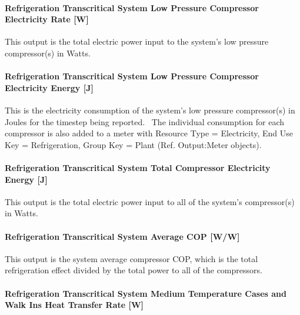 \paragraph{Refrigeration Transcritical System Low Pressure Compressor Electricity Rate {[}W{]}}\label{refrigeration-transcritical-system-low-pressure-compressor-electric-power-w}

This output is the total electric power input to the system's low pressure compressor(s) in Watts.

\paragraph{Refrigeration Transcritical System Low Pressure Compressor Electricity Energy {[}J{]}}\label{refrigeration-transcritical-system-low-pressure-compressor-electric-energy-j}

This is the electricity consumption of the system's low pressure compressor(s) in Joules for the timestep being reported.~ The individual consumption for each compressor is also added to a meter with Resource Type = Electricity, End Use Key = Refrigeration, Group Key = Plant (Ref. Output:Meter objects).

\paragraph{Refrigeration Transcritical System Total Compressor Electricity Energy {[}J{]}}\label{refrigeration-transcritical-system-total-compressor-electric-energy-j}

This output is the total electric power input to all of the system's compressor(s) in Watts.

\paragraph{Refrigeration Transcritical System Average COP {[}W/W{]}}\label{refrigeration-transcritical-system-average-cop-ww}

This output is the system average compressor COP, which is the total refrigeration effect divided by the total power to all of the compressors.

\paragraph{Refrigeration Transcritical System Medium Temperature Cases and Walk Ins Heat Transfer Rate {[}W{]}}\label{refrigeration-transcritical-system-medium-temperature-cases-and-walk-ins-heat-transfer-rate-w}

